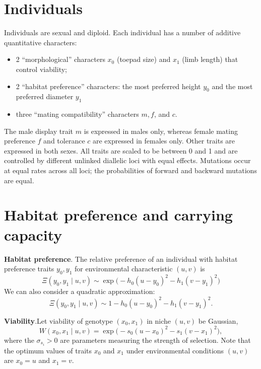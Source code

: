 \documentclass{article}
\begin{document}
\section{Individuals}

Individuals are sexual and diploid. Each individual has a number of additive quantitative characters:
\begin{itemize}
  \item 2 ``morphological'' characters $x_0$ (toepad size) and $x_1$
    (limb length) that control viability;
  \item 2 ``habitat preference'' characters: the most preferred height
    $y_0$ and the most preferred diameter $y_1$
  \item three ``mating compatibility'' characters $m, f$, and $c$.
\end{itemize}

The male display trait $m$ is expressed in males only, whereas female mating preference $f$ and tolerance $c$ are expressed in females only.
Other traits are expressed in both sexes.
All traits are scaled to be between 0 and 1 and are controlled by different unlinked diallelic loci with equal effects.
Mutations occur at equal rates across all loci;
the probabilities of forward and backward mutations are equal.


\newpage
\section{Habitat preference and carrying capacity}

{\bf Habitat preference}.\quad
The relative preference of an individual with habitat preference traits $y_0,y_1$ for environmental characteristic $(u,v)$ is 
\begin{equation}
  \Xi(y_0,y_1\mid u,v) \sim \exp\big(-h_0(u-y_0)^2-h_1(v-y_1)^2\big)
\end{equation}
We can also consider a quadratic approximation:
\begin{equation} \label{quad}
  \Xi(y_0,y_1\mid u,v) \sim 1-h_0(u-y_0)^2-h_1(v-y_1)^2.
\end{equation}

{\bf Viability}.\quad Let viability of genotype $(x_0,x_1)$ in niche $(u,v)$ be Gaussian,
\begin{equation}
  W(x_0,x_1 \mid u,v) = \exp\big(-s_0(u-x_0)^2-s_1(v-x_1)^2\big),
\end{equation}
where the $\sigma_{s_i}>0$ are parameters measuring the strength of selection.
Note that the optimum values of traits $x_0$ and $x_1$ under environmental conditions $(u,v)$ are $x_0 = u$ and $x_1 = v$.\\
\end{document}
